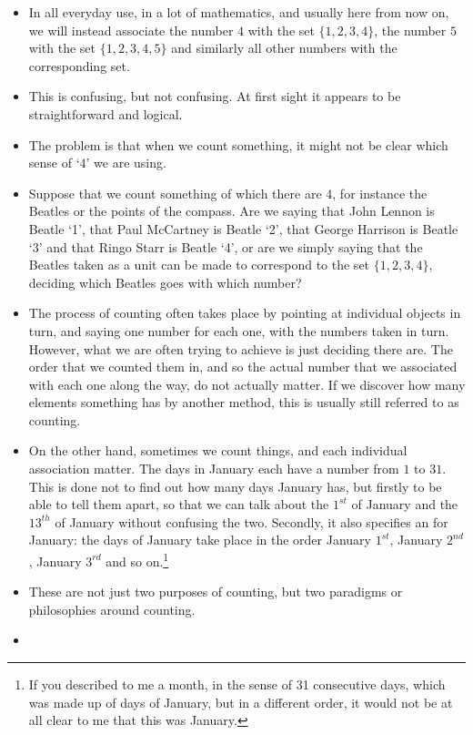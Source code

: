 \begin{itemize}
\item
In all everyday use, in a lot of mathematics, and usually here from now on, we will instead associate the number $4$ with the set $\{1,2,3,4\}$, the number $5$ with the set $\{1,2,3,4,5\}$ and similarly all other numbers with the corresponding set.
\item
This is confusing, but not  confusing. At first sight it appears to be straightforward and logical.
\item
The problem is that when we count something, it might not be clear which sense of `$4$' we are using. 
\item
Suppose that we count something of which there are $4$, for instance the Beatles or the points of the compass. Are we saying that John Lennon is Beatle `1', that Paul McCartney is Beatle `2', that George Harrison is Beatle `3' and that Ringo Starr is Beatle `4', or are we simply saying that the Beatles taken as a unit can be made to correspond to the set $\{1,2,3,4\}$,  deciding which Beatles goes with which number?
\item
The process of counting often takes place by pointing at individual objects in turn, and saying one number for each one, with the numbers taken in turn. However, what we are often trying to achieve is just deciding  there are. The order that we counted them in, and so the actual number that we associated with each one along the way, do not actually matter. If we discover how many elements something has by another method, this is usually still referred to as counting.
\item
On the other hand, sometimes we count things, and each individual association  matter. The days in January each have a number from $1$ to $31$. This is done not to find out how many days January has, but firstly to be able to tell them apart, so that we can talk about the $1^{st}$ of January and the $13^{th}$ of January without confusing the two. Secondly, it also specifies an  for January: the days of January take place in the order January $1^{st}$, January $2^{nd}$, January $3^{rd}$ and so on.\footnote{If you described to me a month, in the sense of 31 consecutive days, which was made up of days of January, but in a different order, it would not be at all clear to me that this was January.}
\item
These are not just two purposes of counting, but two paradigms or philosophies around counting. 
\item

\end{itemize}
